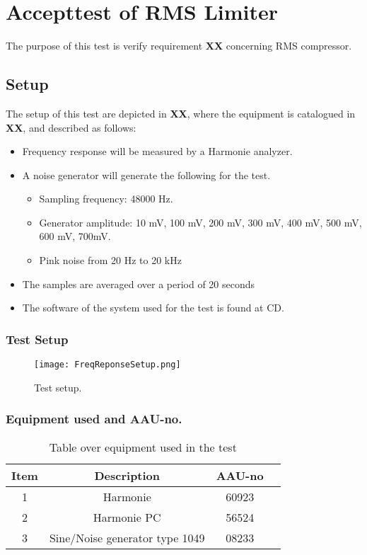 \chapter{Accepttest of RMS Limiter}\label{app:journal_Frequency_Response}
The purpose of this test is verify requirement \textbf{XX} concerning RMS compressor.

\section{Setup}
The setup of this test are depicted in \textbf{XX}, where the equipment is catalogued in \textbf{XX}, and described as follows:

\begin{itemize}
	\item Frequency response will be measured by a Harmonie analyzer.
	\item A noise generator will generate the following for the test. 
	\begin{itemize}
		\item Sampling frequency: 48000 Hz.
		\item Generator amplitude: 10 mV, 100 mV, 200 mV, 300 mV, 400 mV, 500 mV, 600 mV, 700mV.
		\item Pink noise from 20 Hz to 20 kHz
	\end{itemize}
	\item The samples are averaged over a period of 20 seconds
	\item The software of the system used for the test is found at CD. 
\end{itemize}


\subsection*{Test Setup}
\begin{figure}[H]
\centering
\texttt{[image: FreqReponseSetup.png]}
\label{fig:AcceptFreqResponse}
\caption{Test setup.}
\end{figure}

\subsection*{Equipment used and AAU-no.}

\begin{table}[H]
\centering
{}
\begin{tabular}{S[table-format=1]ccc} \toprule
    {Item} & {Description} & {AAU-no} \\       &  Harmonie  & 60923  \\ 
    2      &  Harmonie PC  & 56524  \\ 
    3      &  Sine/Noise generator type 1049  & 08233  \\  \bottomrule 
\end{tabular}
\caption{Table over equipment used in the test}
\label{tab:UsedEquipmentFreqResponse}
\end{table}
\vspace{-5mm}


